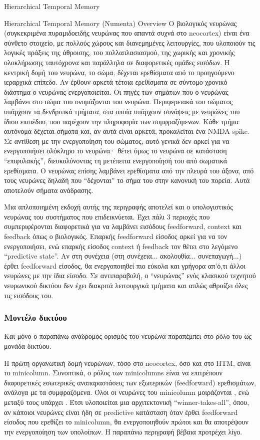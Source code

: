 \documentclass[a4paper,11pt]{article}
\renewcommand{\emph}[1]{\textcolor{blue}{\oldemph{#1}}}
\begin{document}
\begin{section}{Hierarchical Temporal Memory}
\begin{subsection}{Hierarchical Temporal Memory (Numenta) Overview}
	Ο βιολογικός νευρώνας (συγκεκριμένα πυραμιδοειδής νευρώνας που απαντά συχνά στο neocortex) είναι ένα σύνθετο στοιχείο, με πολλούς χώρους και διανεμημένες λειτουργίες, που υλοποιούν τις λογικές πράξεις της άθροισης, του πολλαπλασιασμού, της χωρικής και χρονικής ολοκλήρωσης ταυτόχρονα και παράλληλα σε διαφορετικές ομάδες εισόδων. Η κεντρική δομή του νευρώνα, το σώμα, δέχεται ερεθίσματα από το προηγούμενο ιεραρχικά επίπεδο. Αν έρθουν αρκετά τέτοια ερεθίσματα σε σύντομο χρονικό διάστημα ο νευρώνας ενεργοποιείται. Οι πηγές των σημάτων που ο νευρώνας λαμβάνει στο σώμα του ονομάζονται \emph{receptive field} του νευρώνα.
	Περιφερειακά του σώματος υπάρχουν τα δενδριτικά τμήματα, στα οποία υπάρχουν συνάψεις με νευρώνες του ίδιου επιπέδου, που παρέχουν την πληροφορία των συμφραζόμενων. Κάθε τμήμα αυτόνομα δέχεται σήματα και, αν αυτά είναι αρκετά, προκαλείται ένα NMDA spike. Σε αντίθεση με την ενεργοποίηση του σώματος, αυτό γενικά δεν αρκεί για να ενεργοποιήσει ολόκληρο το νευρώνα· θέτει όμως το νευρώνα σε κατάσταση ``επιφυλακής'', διευκολύνοντας τη μετέπειτα ενεργοποίησή του από σωματικά ερεθίσματα.
	Ο νευρώνας επίσης λαμβάνει ερεθίσματα από την πλευρά του άξονα, από τους νευρώνες δηλαδή που ``δέχονται'' το σήμα του στην κανονική του πορεία. Αυτά αποτελούν σήματα ανάδρασης.

	Μια απλοποιημένη εκδοχή αυτής της περιγραφής αποτελεί και ο υπολογιστικός νευρώνας του συστήματος που επιδεικνύεται. Έχει πάλι 3 περιοχές που συμπεριφέρονται διαφορετικά για να λαμβάνει εισόδους feedforward, context και feedback όπως ο βιολογικός. Επαρκής feedforward είσοδος αρκεί για να τον ενεργοποιήσει, ενώ επαρκής είσοδος context ή feedback τον θέτει στο λεγόμενο ``predictive state''. Αν στη συνέχεια (στη συνέχεια... ακολουθία... συνεπαγωγή...) έρθει feedforward είσοδος, θα ενεργοποιηθεί πιο εύκολα και γρήγορα απ'ό,τι άλλοι νευρώνες με την ίδια είσοδο.
	Σε αντιπαραβολή, ο ``νευρώνας'' ενός κλασικού τεχνητού νευρωνικού δικτύου δεν έχει διακριτά λειτουργικά τμήματα και απλώς αθροίζει όλες τις εισόδους του.

	\subsubsection{Μοντέλο δικτύου}
	Και μόνο ο παραπάνω ανάδρομος ορισμός του νευρώνα παραπέμπει στο ρόλο του ως μονάδα δικτύου.

	Η πρώτη οργανωτική δομή νευρώνων, τόσο στο neocortex, όσο και στο HTM, είναι το minicolumn. Συνοπτικά, ο ρόλος των minicolumns είναι να επιτρέπουν διαφορετικές εσωτερικές αναπαραστάσεις των εξωτερικών (feedforward) ερεθισμάτων, ανάλογα με τα συμφραζόμενα. Όλοι οι νευρώνες του minicolumn μοιράζονται \emph{το ίδιο receptive field}, ενώ μεταξύ τους υπάρχει \emph{inhibition}. Έτσι υλοποιείται μια αρχιτεκτονική ``winner-takes-all'', όπου, αν κάποιοι νευρώνες είναι ήδη σε predictive κατάσταση όταν έρθει feedforward είσοδος που ερεθίζει το minicolumn, θα ενεργοποιηθούν πρώτοι και θα αποτρέψουν την ενεργοποίηση των υπολοίπων.
	Η παραπάνω περιγραφή βέβαια προτρέχει λίγο.


\end{subsection}
\end{section}
\end{document}
